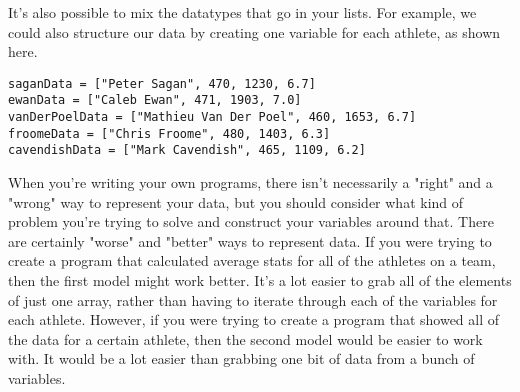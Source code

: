 It's also possible to mix the datatypes that go in your lists. For example, we could also structure our data by creating one variable for each athlete, as shown here.
\begin{lstlisting}[style=pippython]
saganData = ["Peter Sagan", 470, 1230, 6.7]
ewanData = ["Caleb Ewan", 471, 1903, 7.0]
vanDerPoelData = ["Mathieu Van Der Poel", 460, 1653, 6.7]
froomeData = ["Chris Froome", 480, 1403, 6.3]
cavendishData = ["Mark Cavendish", 465, 1109, 6.2]
\end{lstlisting}
When you're writing your own programs, there isn't necessarily a "right" and a "wrong" way to represent your data, but you should consider what kind of problem you're trying to solve and construct your variables around that. There are certainly "worse" and "better" ways to represent data. If you were trying to create a program that calculated average stats for all of the athletes on a team, then the first model might work better. It's a lot easier to grab all of the elements of just one array, rather than having to iterate through each of the variables for each athlete. However, if you were trying to create a program that showed all of the data for a certain athlete, then the second model would be easier to work with. It would be a lot easier than grabbing one bit of data from a bunch of variables.

